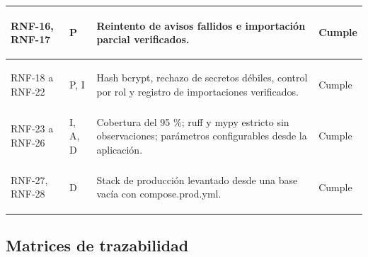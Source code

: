 \documentclass[11pt,a4paper,oneside]{article}
\begin{document}
{\begin{xltabular}{\textwidth}{@{}>{\sffamily\bfseries\raggedright\arraybackslash}p{2.4cm}>{\raggedright\arraybackslash}p{1.3cm}Y>{\raggedright\arraybackslash}p{1.8cm}@{}}
RNF-16, RNF-17 & P & Reintento de avisos fallidos e importación parcial verificados. & Cumple\\ \hline
{}RNF-18 a RNF-22 & P, I & Hash bcrypt, rechazo de secretos débiles, control por rol y registro de importaciones verificados. & Cumple\\ \hline
RNF-23 a RNF-26 & I, A, D & Cobertura del 95 \%; ruff y mypy estricto sin observaciones; parámetros configurables desde la aplicación. & Cumple\\ \hline
{}RNF-27, RNF-28 & D & Stack de producción levantado desde una base vacía con compose.prod.yml. & Cumple\\ \hline
\end{xltabular}}
\vspace{0.6em}

\subsection{Matrices de trazabilidad}
\end{document}
